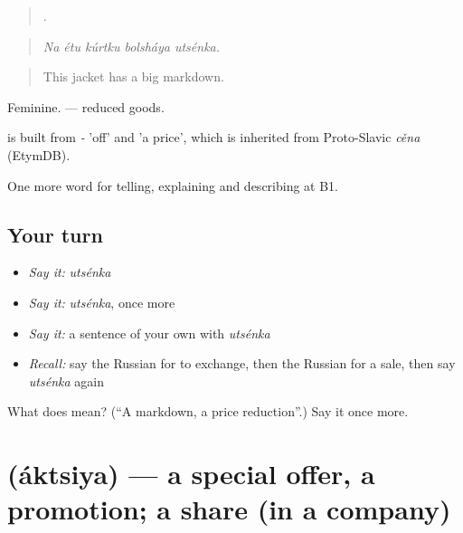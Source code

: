 \begin{quote}
    .
\end{quote}

\begin{quote}
\emph{Na étu kúrtku bolsháya utsénka.}
\end{quote}

\begin{quote}
This jacket has a big markdown.
\end{quote}

Feminine. \emph{  } — reduced goods.

\begin{cousinweb}
\emph{} is built from \emph{-} 'off' and \emph{} 'a price', which is inherited from Proto-Slavic \emph{cěna} (EtymDB).
\end{cousinweb}

\begin{grammarlens}[title={What you've built}]
One more word for telling, explaining and describing at B1.
\end{grammarlens}

\subsection*{Your turn}
\begin{itemize}
\raggedright
  \item \emph{Say it:} \emph{utsénka}
  \item \emph{Say it:} \emph{utsénka}, once more
  \item \emph{Say it:} a sentence of your own with \emph{utsénka}
  \item \emph{Recall:} say the Russian for to exchange, then the Russian for a sale, then say \emph{utsénka} again
\end{itemize}

\begin{tcolorbox}[breakable,colback=teal!4,colframe=teal!35!black,title={Before you move on}]
What does  mean? (\textquotedblleft{}A markdown, a price reduction\textquotedblright{}.) Say it once more.
\end{tcolorbox}
\section[\texorpdfstring{\ru{акция} (áktsiya)}{акция (áktsiya)}]{ (áktsiya) — a special offer, a promotion; a share (in a company)}

